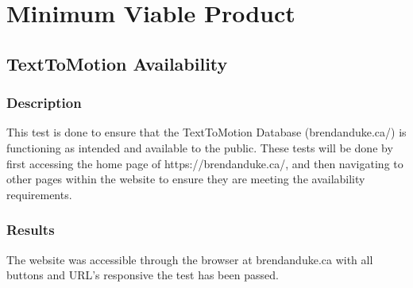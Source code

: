 \documentclass{scrreprt}
\begin{document}
\section{Minimum Viable Product}
\subsection{TextToMotion Availability}

\subsubsection{Description}

This test is done to ensure that the TextToMotion Database (brendanduke.ca/) is functioning as intended and available to the public. These tests will be done by first accessing the home page of https://brendanduke.ca/, and then navigating to other pages within the website to ensure they are meeting the availability requirements.

\subsubsection{Results}

The website was accessible through the browser at brendanduke.ca with all buttons and URL's responsive the test has been passed.
\end{document}
